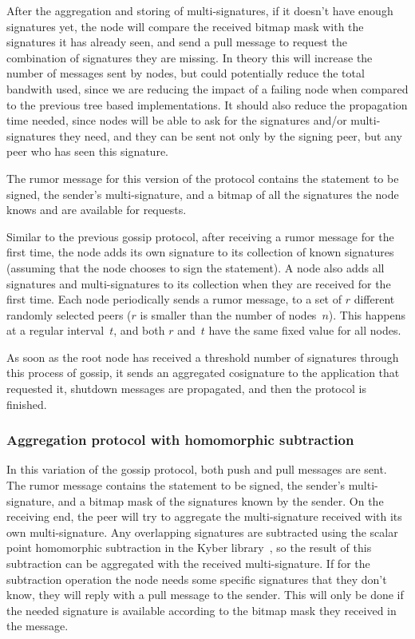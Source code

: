 After the aggregation and storing of multi-signatures, if it doesn't have enough signatures yet, the node will compare the received bitmap mask with the signatures it has already seen, and send a pull message to request the combination of signatures they are missing. In theory this will increase the number of messages sent by nodes, but could potentially reduce the total bandwith used, since we are reducing the impact of a failing node when compared to the previous tree based implementations. It should also reduce the propagation time needed, since nodes will be able to ask for the signatures and/or multi-signatures they need, and they can be sent not only by the signing peer, but any peer who has seen this signature.

The rumor message for this version of the protocol contains the statement to be signed, the sender's  multi-signature, and a bitmap of all the signatures the node knows and are available for requests. 

Similar to the previous gossip protocol, after receiving a rumor message for the first time, the node adds its own signature to its collection of known signatures (assuming that the node chooses to sign the statement).
A node also adds all signatures and multi-signatures to its collection when they are received for the first time.
Each node periodically sends a rumor message, to a set of $r$ different randomly selected peers ($r$ is smaller than the number of nodes~$n$). This happens at a regular interval~$t$, and both $r$ and~$t$ have the same fixed value for all nodes.

As soon as the root node has received a threshold number of signatures through this process of gossip, it sends an aggregated cosignature to the application that requested it, shutdown messages are propagated, and then the protocol is finished.


\subsubsection{Aggregation protocol with homomorphic subtraction}

In this variation of the gossip protocol, both push and pull messages are sent. The rumor message contains the statement to be signed, the sender's multi-signature, and a bitmap mask of the signatures known by the sender. On the receiving end, the peer will try to aggregate the multi-signature received with its own multi-signature. Any overlapping signatures are subtracted using the scalar point homomorphic subtraction in the Kyber library~\cite{Kyber}, so the result of this subtraction can be aggregated with the received multi-signature. If for the subtraction operation the node needs some specific signatures that they don't know, they will reply with a pull message to the sender. This will only be done if the needed signature is available according to the bitmap mask they received in the message. 

